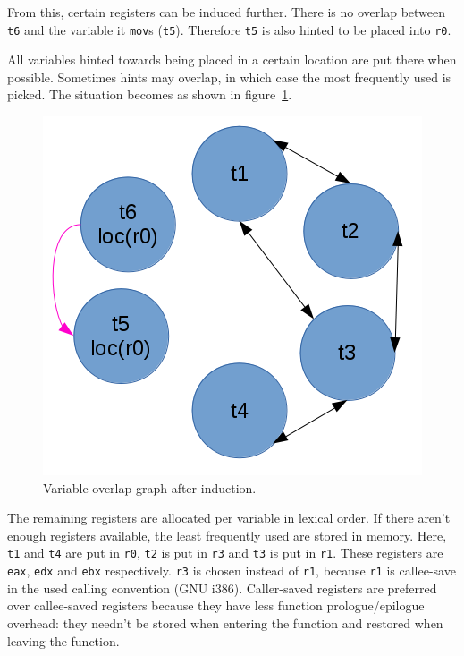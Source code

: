 \documentclass[12pt, a4paper]{article}
\begin{document}
From this, certain registers can be induced further. There is no overlap
between \verb+t6+ and the variable it \verb+mov+s (\verb+t5+). Therefore
\verb+t5+ is also hinted to be placed into \verb+r0+.

All variables hinted towards being placed in a certain location are put there
when possible. Sometimes hints may overlap, in which case the most frequently
used is picked. The situation becomes as shown in figure~\ref{fig:ovl_ind}.

\begin{figure}[h]
\begin{center}
\includegraphics[resolution=128]{ovldump_ind.png}
\caption{Variable overlap graph after induction.}
\label{fig:ovl_ind}
\end{center}
\end{figure}

The remaining registers are allocated per variable in lexical order. If there
aren't enough registers available, the least frequently used are stored in memory.
Here, \verb+t1+ and \verb+t4+ are put in \verb+r0+, \verb+t2+ is put in \verb+r3+
and \verb+t3+ is put in \verb+r1+. These registers are \verb+eax+, \verb+edx+ and
\verb+ebx+ respectively. \verb+r3+ is chosen instead of \verb+r1+, because
\verb+r1+ is callee-save in the used calling convention (GNU i386). Caller-saved
registers are preferred over callee-saved registers because they have less
function prologue/epilogue overhead: they needn't be stored when entering the
function and restored when leaving the function.
\end{document}
